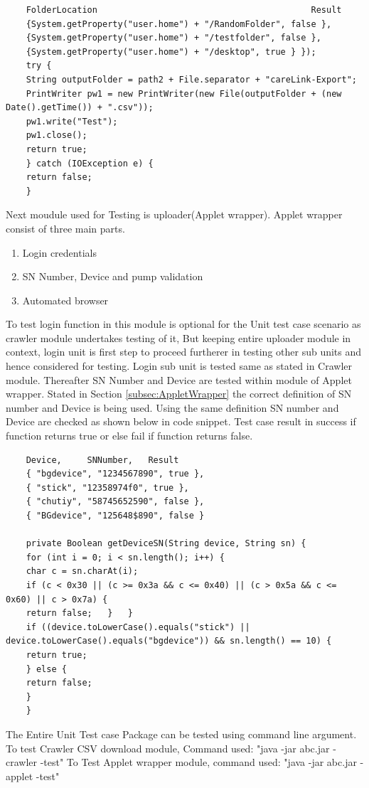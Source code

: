 \documentclass[article,type=msc,colorback,accentcolor=tud9c,twoside,11pt]{tudthesis}
\begin{document}
	\begin{lstlisting}
	FolderLocation											Result
	{System.getProperty("user.home") + "/RandomFolder", false },
	{System.getProperty("user.home") + "/testfolder", false },
	{System.getProperty("user.home") + "/desktop", true } });
	try {
	String outputFolder = path2 + File.separator + "careLink-Export";
	PrintWriter pw1 = new PrintWriter(new File(outputFolder + (new Date().getTime()) + ".csv"));
	pw1.write("Test");
	pw1.close();
	return true;
	} catch (IOException e) {
	return false;
	}
	\end{lstlisting}
	Next moudule used for Testing is uploader(Applet wrapper). Applet wrapper consist of three main parts.
	\begin{enumerate}
		\item Login credentials
		\item SN Number, Device and pump validation
		\item Automated browser
	\end{enumerate}
	To test login function in this module is optional for the Unit test case scenario as crawler module undertakes testing of it, But keeping entire uploader module in context, login unit is first step to proceed furtherer in testing other sub units and hence considered for testing. Login sub unit is tested same as stated in Crawler module. Thereafter SN Number and Device are tested within module of Applet wrapper. Stated in Section \ref{subsec:AppletWrapper} the correct definition of SN number and Device is being used. Using the same definition SN number and Device are checked as shown below in code snippet. Test case result in success if function returns true or else fail if function returns false.
	\begin{lstlisting}
	Device, 	SNNumber, 	Result
	{ "bgdevice", "1234567890", true },
	{ "stick", "12358974f0", true },
	{ "chutiy", "58745652590", false },
	{ "BGdevice", "125648$890", false }
	
	private Boolean getDeviceSN(String device, String sn) {
	for (int i = 0; i < sn.length(); i++) {
	char c = sn.charAt(i);
	if (c < 0x30 || (c >= 0x3a && c <= 0x40) || (c > 0x5a && c <= 0x60) || c > 0x7a) {
	return false; 	} 	}
	if ((device.toLowerCase().equals("stick") || device.toLowerCase().equals("bgdevice")) && sn.length() == 10) {
	return true;
	} else {
	return false;
	}
	}
	\end{lstlisting}
	The Entire Unit Test case Package can be tested using command line argument.
	To test Crawler CSV download module, Command used:\newline
	"java -jar abc.jar -crawler -test"\newline 
	To Test Applet wrapper module, command used:\newline
	"java -jar abc.jar - applet -test"
	
\end{document}
